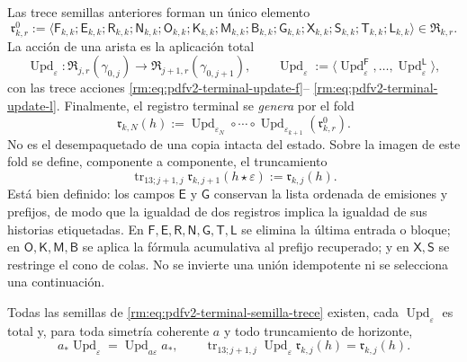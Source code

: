 Las trece semillas anteriores forman un único elemento
\begin{equation}
\label{rm:eq:pdfv2-terminal-semilla-trece}
 \mathfrak r^0_{k,r}:=
 \langle
 \mathsf F_{k,k};\mathsf E_{k,k};\mathsf R_{k,k};\mathsf N_{k,k};
 \mathsf O_{k,k};\mathsf K_{k,k};\mathsf M_{k,k};\mathsf B_{k,k};
 \mathsf G_{k,k};\mathsf X_{k,k};\mathsf S_{k,k};\mathsf T_{k,k};
 \mathsf L_{k,k}
 \rangle\in\mathfrak R_{k,r}.
\end{equation}
La acción de una arista es la aplicación total
\begin{equation}
\label{rm:eq:pdfv2-terminal-actualizacion-unica}
 \operatorname{Upd}_\varepsilon:
 \mathfrak R_{j,r}(\gamma_{0,j})
 \longrightarrow\mathfrak R_{j+1,r}(\gamma_{0,j+1}),\qquad
 \operatorname{Upd}_\varepsilon:=
 \langle\operatorname{Upd}^{\mathsf F}_\varepsilon,\ldots,
 \operatorname{Upd}^{\mathsf L}_\varepsilon\rangle,
\end{equation}
con las trece acciones
\eqref{rm:eq:pdfv2-terminal-update-f}--
\eqref{rm:eq:pdfv2-terminal-update-l}. Finalmente, el registro terminal se
\emph{genera} por el fold
\begin{equation}
\label{rm:eq:pdfv2-terminal-registro-trece}
 \boxed{
 \mathfrak r_{k,N}(h):=
 \operatorname{Upd}_{\varepsilon_N}\circ\cdots\circ
 \operatorname{Upd}_{\varepsilon_{k+1}}(\mathfrak r^0_{k,r}).}
\end{equation}
No es el desempaquetado de una copia intacta del estado.
Sobre la imagen de este fold se define, componente a componente, el
truncamiento
\begin{equation}
\label{rm:eq:pdfv2-terminal-truncamiento-trece-def}
 \operatorname{tr}_{13;j+1,j}
 \mathfrak r_{k,j+1}(h\star\varepsilon)
 :=\mathfrak r_{k,j}(h).
\end{equation}
Está bien definido: los campos \(\mathsf E\) y \(\mathsf G\) conservan la
lista ordenada de emisiones y prefijos, de modo que la igualdad de dos
registros implica la igualdad de sus historias etiquetadas. En
\(\mathsf F,\mathsf E,\mathsf R,\mathsf N,\mathsf G,\mathsf T,\mathsf L\)
se elimina la última entrada o bloque; en \(\mathsf O,\mathsf K,\mathsf M,
\mathsf B\) se aplica la fórmula acumulativa al prefijo recuperado; y en
\(\mathsf X,\mathsf S\) se restringe el cono de colas. No se invierte una
unión idempotente ni se selecciona una continuación.

\begin{proposition}
\label{rm:prop:pdfv2-terminal-trece-total-natural}
Todas las semillas de \eqref{rm:eq:pdfv2-terminal-semilla-trece} existen, cada
\(\operatorname{Upd}_\varepsilon\) es total y, para toda simetría coherente
\(a\) y todo truncamiento de horizonte,
\begin{equation}
\label{rm:eq:pdfv2-terminal-trece-naturalidad}
 a_*\operatorname{Upd}_\varepsilon
 =\operatorname{Upd}_{a\varepsilon}a_*,
 \qquad
 \operatorname{tr}_{13;j+1,j}
 \operatorname{Upd}_\varepsilon\mathfrak r_{k,j}(h)
 =\mathfrak r_{k,j}(h).
\end{equation}
\end{proposition}

